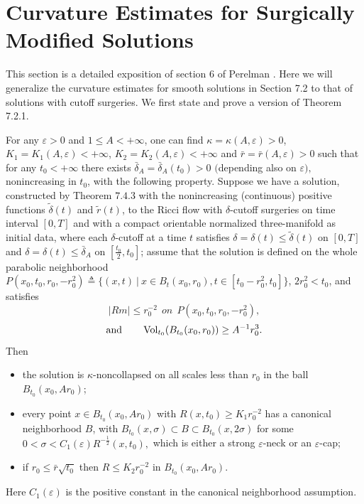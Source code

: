 \section{Curvature Estimates for Surgically Modified Solutions}

This section is a detailed exposition of section 6 of Perelman
\cite{P2}. Here we will generalize the curvature estimates for
smooth solutions in Section 7.2 to that of solutions with cutoff
surgeries. We first state and prove a version of Theorem 7.2.1.

\begin{theorem}
  \label{thm:cz-bounded-time-surgery-curvature-estimate}

For any $\varepsilon > 0$ and  $1 \leq A<+\infty$, one can find
$\kappa=\kappa(A,\varepsilon)>0$,
$K_1=K_1(A,\varepsilon)<+\infty$, $K_2=K_2(A,\varepsilon)<+\infty$
and $\bar{r}=\bar{r}(A,\varepsilon)>0$ such that for any
$t_0<+\infty$ there exists $\bar{\delta}_A=\bar{\delta}_A(t_0)>0$
$($depending also on $\varepsilon),$ nonincreasing in $t_0$, with
the following property. Suppose we have a solution, constructed by
Theorem $7.4.3$ with the nonincreasing (continuous) positive
functions $\widetilde{\delta}(t)$ and $\widetilde{r}(t)$, to the
Ricci flow with $\delta$-cutoff surgeries on time interval $[0,T]$
and with a compact orientable normalized three-manifold as initial
data, where each $\delta$-cutoff at a time $t$ satisfies
$\delta=\delta(t) \leq \widetilde{\delta}(t)$ on $[0,T]$ and
$\delta=\delta(t) \leq \bar{\delta}_A$ on $[\frac{t_0}{2},t_0]$;
assume that the solution is defined on the whole parabolic
neighborhood $P(x_0,t_0,r_0,-r^2_0)\triangleq\{(x,t)\ |\ x\in
B_t(x_0,r_0),t\in[t_0-r^2_0,t_0]\}$, $2r^2_0<t_0$, and satisfies
$$
|Rm|\leq r^{-2}_0 \ \ on \ \ P(x_0,t_0,r_0,-r^2_0),
$$
$$
\text{and} \qquad \operatorname{Vol}_{t_0}(B_{t_0}(x_0,r_0))\geq A^{-1}r^3_0.
$$
Then
\begin{itemize}
\item[(i)] the solution is $\kappa$-noncollapsed on all scales
less than $r_0$ in the ball $B_{t_0}(x_0,Ar_0)$; \item[(ii)] every
point $x\in B_{t_0}(x_0,Ar_0)$ with $R(x,t_0)\geq K_1r^{-2}_0$ has
a canonical neighborhood $B$, with $ B_{t_0}(x,\sigma)\subset
B\subset B_{t_0}(x,2\sigma)$ for some
$0<\sigma<C_1(\varepsilon)R^{-\frac{1}{2}}(x,t_0), $ which is
either a strong $\varepsilon$-neck or an $\varepsilon$-cap;
\item[(iii)] if $r_0\leq \bar{r}\sqrt{t_0}$ then $R\leq
K_2r^{-2}_0$ in $B_{t_0}(x_0,Ar_0)$.
\end{itemize}
Here $C_1(\varepsilon)$ is the positive constant in the canonical
neighborhood assumption.

\end{theorem}

